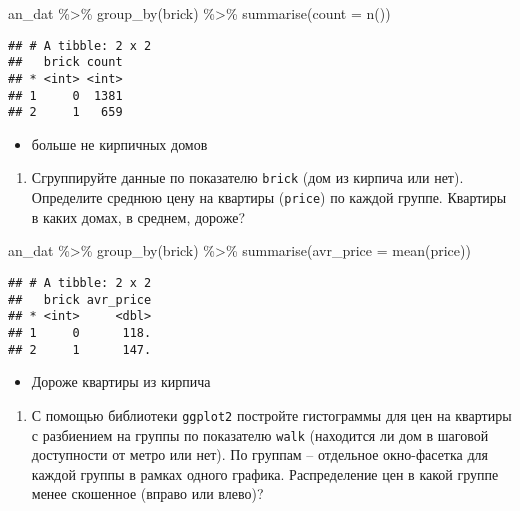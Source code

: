 \documentclass[
]{article}
\newenvironment{Shaded}{\begin{snugshade}}{\end{snugshade}}
\newcommand{\AttributeTok}[1]{\textcolor[rgb]{0.77,0.63,0.00}{#1}}
\newcommand{\FunctionTok}[1]{\textcolor[rgb]{0.00,0.00,0.00}{#1}}
\newcommand{\NormalTok}[1]{#1}
\newcommand{\SpecialCharTok}[1]{\textcolor[rgb]{0.00,0.00,0.00}{#1}}
\providecommand{\tightlist}{%
  \setlength{\itemsep}{0pt}\setlength{\parskip}{0pt}}
\begin{document}
\begin{Shaded}
\begin{Highlighting}[]
\NormalTok{an\_dat }\SpecialCharTok{\%\textgreater{}\%} \FunctionTok{group\_by}\NormalTok{(brick) }\SpecialCharTok{\%\textgreater{}\%} \FunctionTok{summarise}\NormalTok{(}\AttributeTok{count =} \FunctionTok{n}\NormalTok{())}
\end{Highlighting}
\end{Shaded}

\begin{verbatim}
## # A tibble: 2 x 2
##   brick count
## * <int> <int>
## 1     0  1381
## 2     1   659
\end{verbatim}

\begin{itemize}
\tightlist
\item
  больше не кирпичных домов
\end{itemize}

\begin{enumerate}
\def\labelenumi{\arabic{enumi}.}
\setcounter{enumi}{2}
\tightlist
\item
  Сгруппируйте данные по показателю \texttt{brick} (дом из кирпича или
  нет). Определите среднюю цену на квартиры (\texttt{price}) по каждой
  группе. Квартиры в каких домах, в среднем, дороже?
\end{enumerate}

\begin{Shaded}
\begin{Highlighting}[]
\NormalTok{an\_dat }\SpecialCharTok{\%\textgreater{}\%} \FunctionTok{group\_by}\NormalTok{(brick) }\SpecialCharTok{\%\textgreater{}\%} \FunctionTok{summarise}\NormalTok{(}\AttributeTok{avr\_price =} \FunctionTok{mean}\NormalTok{(price))}
\end{Highlighting}
\end{Shaded}

\begin{verbatim}
## # A tibble: 2 x 2
##   brick avr_price
## * <int>     <dbl>
## 1     0      118.
## 2     1      147.
\end{verbatim}

\begin{itemize}
\tightlist
\item
  Дороже квартиры из кирпича
\end{itemize}

\begin{enumerate}
\def\labelenumi{\arabic{enumi}.}
\setcounter{enumi}{3}
\tightlist
\item
  С помощью библиотеки \texttt{ggplot2} постройте гистограммы для цен на
  квартиры с разбиением на группы по показателю \texttt{walk} (находится
  ли дом в шаговой доступности от метро или нет). По группам --
  отдельное окно-фасетка для каждой группы в рамках одного графика.
  Распределение цен в какой группе менее скошенное (вправо или влево)?
\end{enumerate}
\end{document}
